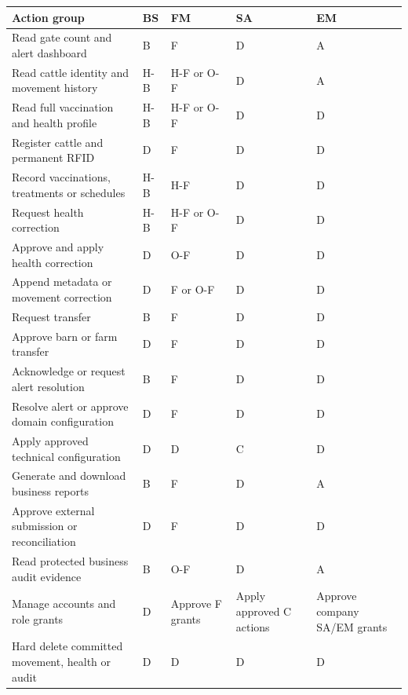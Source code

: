 {\footnotesize
\begin{longtable}[]{|>{\raggedright\arraybackslash}p{}|>{\raggedright\arraybackslash}p{}|>{\raggedright\arraybackslash}p{}|>{\raggedright\arraybackslash}p{}|>{\raggedright\arraybackslash}p{}|}
\hline
\textbf{Action group} & \textbf{BS} & \textbf{FM} & \textbf{SA} & \textbf{EM} \\ \hline
\endhead
Read gate count and alert dashboard & B & F & D & A \\ \hline
Read cattle identity and movement history & H-B & H-F or O-F & D & A \\ \hline
Read full vaccination and health profile & H-B & H-F or O-F & D & D \\ \hline
Register cattle and permanent RFID & D & F & D & D \\ \hline
Record vaccinations, treatments or schedules & H-B & H-F & D & D \\ \hline
Request health correction & H-B & H-F or O-F & D & D \\ \hline
Approve and apply health correction & D & O-F & D & D \\ \hline
Append metadata or movement correction & D & F or O-F & D & D \\ \hline
Request transfer & B & F & D & D \\ \hline
Approve barn or farm transfer & D & F & D & D \\ \hline
Acknowledge or request alert resolution & B & F & D & D \\ \hline
Resolve alert or approve domain configuration & D & F & D & D \\ \hline
Apply approved technical configuration & D & D & C & D \\ \hline
Generate and download business reports & B & F & D & A \\ \hline
Approve external submission or reconciliation & D & F & D & D \\ \hline
Read protected business audit evidence & B & O-F & D & A \\ \hline
Manage accounts and role grants & D & Approve F grants & Apply approved
C actions & Approve company SA/EM grants \\ \hline
Hard delete committed movement, health or audit & D & D & D & D \\ \hline
\end{longtable}
}

